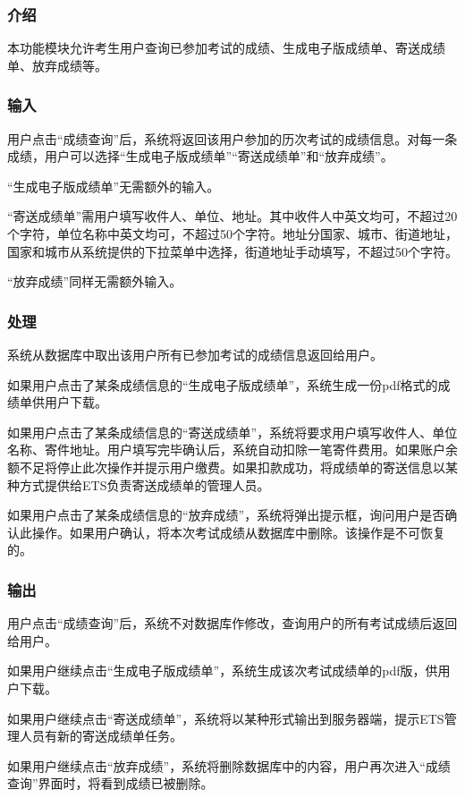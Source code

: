 \subsubsection{介绍}
本功能模块允许考生用户查询已参加考试的成绩、生成电子版成绩单、寄送成绩单、放弃成绩等。

\subsubsection{输入}
用户点击“成绩查询”后，系统将返回该用户参加的历次考试的成绩信息。对每一条成绩，用户可以选择“生成电子版成绩单”“寄送成绩单”和“放弃成绩”。

“生成电子版成绩单”无需额外的输入。

“寄送成绩单”需用户填写收件人、单位、地址。其中收件人中英文均可，不超过20个字符，单位名称中英文均可，不超过50个字符。地址分国家、城市、街道地址，国家和城市从系统提供的下拉菜单中选择，街道地址手动填写，不超过50个字符。

“放弃成绩”同样无需额外输入。

\subsubsection{处理}
系统从数据库中取出该用户所有已参加考试的成绩信息返回给用户。

如果用户点击了某条成绩信息的“生成电子版成绩单”，系统生成一份pdf格式的成绩单供用户下载。

如果用户点击了某条成绩信息的“寄送成绩单”，系统将要求用户填写收件人、单位名称、寄件地址。用户填写完毕确认后，系统自动扣除一笔寄件费用。如果账户余额不足将停止此次操作并提示用户缴费。如果扣款成功，将成绩单的寄送信息以某种方式提供给ETS负责寄送成绩单的管理人员。

如果用户点击了某条成绩信息的“放弃成绩”，系统将弹出提示框，询问用户是否确认此操作。如果用户确认，将本次考试成绩从数据库中删除。该操作是不可恢复的。

\subsubsection{输出}
用户点击“成绩查询”后，系统不对数据库作修改，查询用户的所有考试成绩后返回给用户。

如果用户继续点击“生成电子版成绩单”，系统生成该次考试成绩单的pdf版，供用户下载。

如果用户继续点击“寄送成绩单”，系统将以某种形式输出到服务器端，提示ETS管理人员有新的寄送成绩单任务。

如果用户继续点击“放弃成绩”，系统将删除数据库中的内容，用户再次进入“成绩查询”界面时，将看到成绩已被删除。

